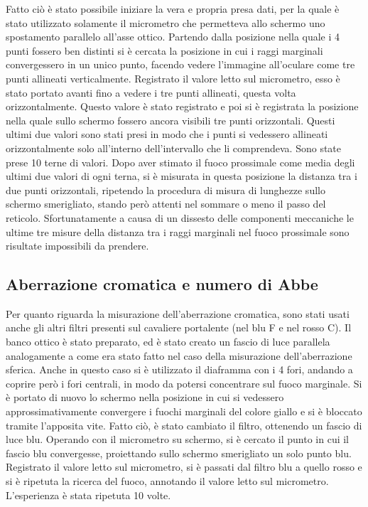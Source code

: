 Fatto ciò è stato possibile 
iniziare la vera e propria presa dati, per la quale è stato 
utilizzato solamente il micrometro che permetteva allo schermo uno 
spostamento parallelo all'asse ottico. Partendo dalla posizione nella quale 
i 4 punti fossero ben distinti si è cercata la posizione in cui i 
raggi marginali convergessero in un unico punto, facendo vedere 
l'immagine all'oculare come tre punti allineati verticalmente. 
Registrato il valore letto sul micrometro, esso è stato portato avanti 
fino a vedere i tre punti allineati, questa volta
orizzontalmente. Questo valore è stato registrato e poi si è 
registrata la posizione nella quale sullo schermo fossero ancora visibili 
tre punti orizzontali. Questi ultimi due valori sono stati presi in modo 
che i punti si vedessero allineati orizzontalmente solo all'interno 
dell'intervallo che li comprendeva. Sono state prese 10 terne di valori. 
Dopo aver stimato il fuoco prossimale come media degli ultimi due valori 
di ogni terna, si è misurata in questa posizione la distanza tra i due 
punti orizzontali, ripetendo la procedura di misura di lunghezze sullo 
schermo smerigliato, stando però attenti nel sommare o meno il passo del reticolo.
Sfortunatamente a causa di un dissesto delle componenti meccaniche le 
ultime tre misure della distanza tra i raggi marginali nel 
fuoco prossimale sono risultate impossibili da prendere.

\subsection{Aberrazione cromatica e numero di Abbe}
Per quanto riguarda la misurazione dell'aberrazione cromatica, 
sono stati usati anche gli altri filtri presenti sul cavaliere 
portalente (nel blu F e nel rosso C). Il banco ottico è stato 
preparato, ed è stato creato un fascio di luce parallela 
analogamente a come era stato fatto nel caso della misurazione 
dell'aberrazione sferica. Anche in questo caso si è utilizzato 
il diaframma con i 4 fori, andando a coprire però i fori 
centrali, in modo da potersi concentrare sul fuoco marginale. 
Si è portato di nuovo lo schermo nella posizione in cui si 
vedessero approssimativamente convergere i fuochi marginali 
del colore giallo e si è bloccato tramite l'apposita vite. 
Fatto ciò, è stato cambiato il filtro, ottenendo un fascio 
di luce blu. Operando con il micrometro su schermo, si è 
cercato il punto in cui il fascio blu convergesse, 
proiettando sullo schermo smerigliato un solo punto blu. 
Registrato il valore letto sul micrometro, si è passati 
dal filtro blu a quello rosso e si è ripetuta la ricerca 
del fuoco, annotando il valore letto sul micrometro. 
L'esperienza è stata ripetuta 10 volte.

